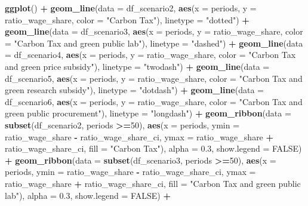 \documentclass[
]{article}
\newenvironment{Shaded}{\begin{snugshade}}{\end{snugshade}}
\newcommand{\AttributeTok}[1]{\textcolor[rgb]{0.13,0.29,0.53}{#1}}
\newcommand{\ConstantTok}[1]{\textcolor[rgb]{0.56,0.35,0.01}{#1}}
\newcommand{\DecValTok}[1]{\textcolor[rgb]{0.00,0.00,0.81}{#1}}
\newcommand{\FloatTok}[1]{\textcolor[rgb]{0.00,0.00,0.81}{#1}}
\newcommand{\FunctionTok}[1]{\textcolor[rgb]{0.13,0.29,0.53}{\textbf{#1}}}
\newcommand{\NormalTok}[1]{#1}
\newcommand{\SpecialCharTok}[1]{\textcolor[rgb]{0.81,0.36,0.00}{\textbf{#1}}}
\newcommand{\StringTok}[1]{\textcolor[rgb]{0.31,0.60,0.02}{#1}}
\begin{document}
\begin{Shaded}
\begin{Highlighting}[]
\FunctionTok{ggplot}\NormalTok{() }\SpecialCharTok{+}
  \FunctionTok{geom\_line}\NormalTok{(}\AttributeTok{data =}\NormalTok{ df\_scenario2, }\FunctionTok{aes}\NormalTok{(}\AttributeTok{x =}\NormalTok{ periods, }\AttributeTok{y =}\NormalTok{ ratio\_wage\_share, }\AttributeTok{color =} \StringTok{"Carbon Tax"}\NormalTok{), }\AttributeTok{linetype =} \StringTok{"dotted"}\NormalTok{) }\SpecialCharTok{+}
  \FunctionTok{geom\_line}\NormalTok{(}\AttributeTok{data =}\NormalTok{ df\_scenario3, }\FunctionTok{aes}\NormalTok{(}\AttributeTok{x =}\NormalTok{ periods, }\AttributeTok{y =}\NormalTok{ ratio\_wage\_share, }\AttributeTok{color =} \StringTok{"Carbon Tax and green public lab"}\NormalTok{), }\AttributeTok{linetype =} \StringTok{"dashed"}\NormalTok{) }\SpecialCharTok{+}
  \FunctionTok{geom\_line}\NormalTok{(}\AttributeTok{data =}\NormalTok{ df\_scenario4, }\FunctionTok{aes}\NormalTok{(}\AttributeTok{x =}\NormalTok{ periods, }\AttributeTok{y =}\NormalTok{ ratio\_wage\_share, }\AttributeTok{color =} \StringTok{"Carbon Tax and green price subsidy"}\NormalTok{), }\AttributeTok{linetype =} \StringTok{"twodash"}\NormalTok{) }\SpecialCharTok{+}
  \FunctionTok{geom\_line}\NormalTok{(}\AttributeTok{data =}\NormalTok{ df\_scenario5, }\FunctionTok{aes}\NormalTok{(}\AttributeTok{x =}\NormalTok{ periods, }\AttributeTok{y =}\NormalTok{ ratio\_wage\_share, }\AttributeTok{color =} \StringTok{"Carbon Tax and green research subsidy"}\NormalTok{), }\AttributeTok{linetype =} \StringTok{"dotdash"}\NormalTok{) }\SpecialCharTok{+}
  \FunctionTok{geom\_line}\NormalTok{(}\AttributeTok{data =}\NormalTok{ df\_scenario6, }\FunctionTok{aes}\NormalTok{(}\AttributeTok{x =}\NormalTok{ periods, }\AttributeTok{y =}\NormalTok{ ratio\_wage\_share, }\AttributeTok{color =} \StringTok{"Carbon Tax and green public procurement"}\NormalTok{), }\AttributeTok{linetype =} \StringTok{"longdash"}\NormalTok{) }\SpecialCharTok{+}
  \FunctionTok{geom\_ribbon}\NormalTok{(}\AttributeTok{data =} \FunctionTok{subset}\NormalTok{(df\_scenario2, periods }\SpecialCharTok{\textgreater{}=}\DecValTok{50}\NormalTok{), }\FunctionTok{aes}\NormalTok{(}\AttributeTok{x =}\NormalTok{ periods, }\AttributeTok{ymin =}\NormalTok{ ratio\_wage\_share }\SpecialCharTok{{-}}\NormalTok{ ratio\_wage\_share\_ci, }\AttributeTok{ymax =}\NormalTok{ ratio\_wage\_share }\SpecialCharTok{+}\NormalTok{ ratio\_wage\_share\_ci, }\AttributeTok{fill =} \StringTok{"Carbon Tax"}\NormalTok{), }\AttributeTok{alpha =} \FloatTok{0.3}\NormalTok{, }\AttributeTok{show.legend =} \ConstantTok{FALSE}\NormalTok{) }\SpecialCharTok{+}
  \FunctionTok{geom\_ribbon}\NormalTok{(}\AttributeTok{data =} \FunctionTok{subset}\NormalTok{(df\_scenario3, periods }\SpecialCharTok{\textgreater{}=}\DecValTok{50}\NormalTok{), }\FunctionTok{aes}\NormalTok{(}\AttributeTok{x =}\NormalTok{ periods, }\AttributeTok{ymin =}\NormalTok{ ratio\_wage\_share }\SpecialCharTok{{-}}\NormalTok{ ratio\_wage\_share\_ci, }\AttributeTok{ymax =}\NormalTok{ ratio\_wage\_share }\SpecialCharTok{+}\NormalTok{ ratio\_wage\_share\_ci, }\AttributeTok{fill =} \StringTok{"Carbon Tax and green public lab"}\NormalTok{), }\AttributeTok{alpha =} \FloatTok{0.3}\NormalTok{, }\AttributeTok{show.legend =} \ConstantTok{FALSE}\NormalTok{) }\SpecialCharTok{+}

\end{Highlighting}
\end{Shaded}
\end{document}
